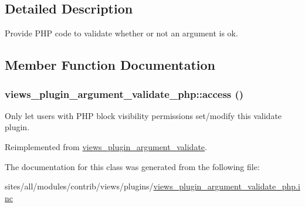 \subsection{Detailed Description}
Provide PHP code to validate whether or not an argument is ok. 

\subsection{Member Function Documentation}
\hypertarget{classviews__plugin__argument__validate__php_11100ee9f3e1d9ec27f3f1b151994d1c}{
\subsubsection[{access}]{\setlength{\rightskip}{0pt plus 5cm}views\_\-plugin\_\-argument\_\-validate\_\-php::access ()}}
\label{classviews__plugin__argument__validate__php_11100ee9f3e1d9ec27f3f1b151994d1c}


Only let users with PHP block visibility permissions set/modify this validate plugin. 

Reimplemented from \hyperlink{classviews__plugin__argument__validate_b90c095a5a91dcf8dfae02dc975d974e}{views\_\-plugin\_\-argument\_\-validate}.

The documentation for this class was generated from the following file:\begin{CompactItemize}
\item 
sites/all/modules/contrib/views/plugins/\hyperlink{views__plugin__argument__validate__php_8inc}{views\_\-plugin\_\-argument\_\-validate\_\-php.inc}\end{CompactItemize}
